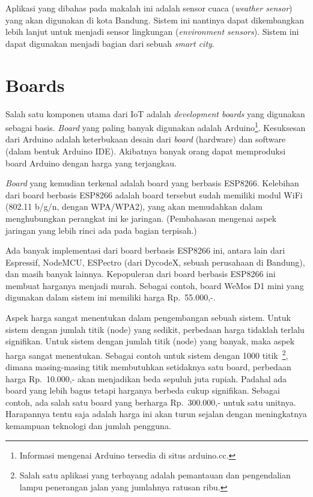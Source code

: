 \documentclass[
10pt, %
a4paper, %
oneside, %
headinclude,footinclude, %
BCOR5mm, %
]{scrartcl}
\begin{document}
Aplikasi yang dibahas pada makalah ini adalah sensor cuaca ({\em weather
sensor}) yang akan digunakan di kota Bandung. Sistem ini nantinya dapat
dikembangkan lebih lanjut untuk menjadi sensor lingkungan ({\em environment
sensors}). Sistem ini dapat digunakan menjadi bagian dari sebuah {\em smart
city}.

\section{Boards}
Salah satu komponen utama dari IoT adalah {\em development boards} yang
digunakan sebagai basis. {\em Board} yang paling banyak digunakan adalah
Arduino\footnote{Informasi mengenai Arduino tersedia di situs arduino.cc.}.
Kesuksesan dari Arduino adalah keterbukaan desain dari {\em board} (hardware)
dan software (dalam bentuk Arduino IDE). Akibatnya banyak orang dapat
memproduksi board Arduino dengan harga yang terjangkau.

{\em Board} yang kemudian terkenal adalah board yang berbasis ESP8266.
Kelebihan dari board berbasis ESP8266 adalah board tersebut sudah memiliki
modul WiFi (802.11 b/g/n, dengan WPA/WPA2), yang akan memudahkan dalam
menghubungkan perangkat ini ke jaringan.  (Pembahasan mengenai aspek jaringan
yang lebih rinci ada pada bagian terpisah.)

Ada banyak implementasi dari board berbasis ESP8266 ini, antara lain dari
Espressif, NodeMCU, ESPectro (dari DycodeX, sebuah perusahaan di Bandung), dan
masih banyak lainnya. Kepopuleran dari board berbasis ESP8266 ini membuat
harganya menjadi murah. Sebagai contoh, board WeMos D1 mini yang digunakan
dalam sistem ini memiliki harga Rp.~55.000,-.

Aspek harga sangat menentukan dalam pengembangan sebuah sistem. Untuk sistem
dengan jumlah titik (node) yang sedikit, perbedaan harga tidaklah terlalu
signifikan. Untuk sistem dengan jumlah titik (node) yang banyak, maka aspek
harga sangat menentukan. Sebagai contoh untuk sistem dengan 1000
titik~\footnote{Salah satu aplikasi yang terbayang adalah pemantauan dan
pengendalian lampu penerangan jalan yang jumlahnya ratusan ribu.}, dimana
masing-masing titik membutuhkan setidaknya satu board, perbedaan harga
Rp.~10.000,- akan menjadikan beda sepuluh juta rupiah. Padahal ada board yang
lebih bagus tetapi harganya berbeda cukup signifikan. Sebagai contoh, ada salah
satu board yang berharga Rp.~300.000,- untuk satu unitnya. Harapannya tentu
saja adalah harga ini akan turun sejalan dengan meningkatnya kemampuan
teknologi dan jumlah pengguna.
\end{document}
